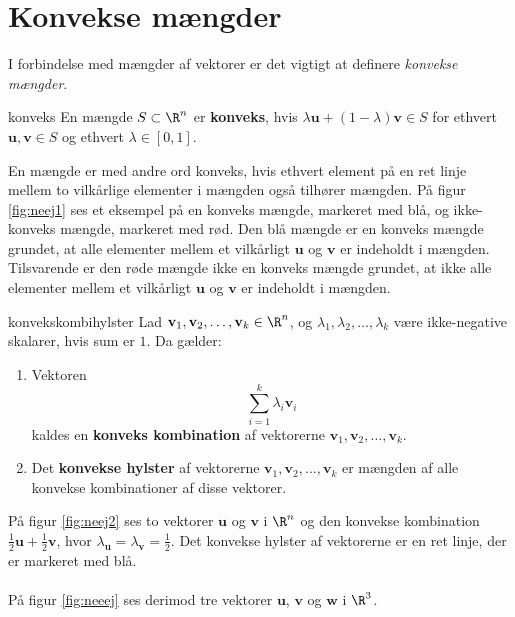 \section{Konvekse mængder}
\label{julieerlakker}
%
I forbindelse med mængder af vektorer er det vigtigt at definere \textit{konvekse mængder}.
%
\begin{defn}{}{konveks}
En mængde $S \subset \R^n$ er \textbf{konveks}, hvis $\lambda \textbf{u} + (1- \lambda ) \textbf{v} \in S$ for ethvert $\textbf{u}, \textbf{v} \in S$ og ethvert $\lambda \in [0,1]$. 
\end{defn}
\noindent
%
En mængde er med andre ord konveks, hvis ethvert element på en ret linje mellem to vilkårlige elementer i mængden også tilhører mængden. 
På figur \ref{fig:neej1} ses et eksempel på en konveks mængde, markeret med blå, og ikke-konveks mængde, markeret med rød.
Den blå mængde er en konveks mængde grundet, at alle elementer mellem et vilkårligt $\textbf{u}$ og $\textbf{v}$ er indeholdt i mængden.
Tilsvarende er den røde mængde ikke en konveks mængde grundet, at ikke alle elementer mellem et vilkårligt $\textbf{u}$ og $\textbf{v}$ er indeholdt i mængden.\\
%

%
\begin{defn}{}{konvekskombihylster}
Lad $\textbf{v}_1, \textbf{v}_2, \ldots, \textbf{v}_k \in \R^n$, og $\lambda_1, \lambda_2, \ldots, \lambda_k$ være ikke-negative skalarer, hvis sum er $1$. Da gælder:
%
\begin{enumerate}[label=(\alph*)]
	\item Vektoren $$\sum_{i=1}^{k} \lambda_i \textbf{v}_i$$ kaldes en \textbf{konveks kombination} af vektorerne $\textbf{v}_1, \textbf{v}_2, \ldots, \textbf{v}_k$. 
	\item Det \textbf{konvekse hylster} af vektorerne $\textbf{v}_1, \textbf{v}_2, \ldots, \textbf{v}_k$ er mængden af alle konvekse kombinationer af disse vektorer. 
\end{enumerate}
%
%
\end{defn}
%
På figur \ref{fig:neej2} ses to vektorer $\mathbf{u}$ og $\mathbf{v}$ i $\R^n$ og den konvekse kombination $\frac{1}{2} \mathbf{u}+\frac{1}{2} \mathbf{v}$, hvor $\lambda_\textbf{u} = \lambda_\textbf{v} = \frac{1}{2}$. 
Det konvekse hylster af vektorerne er en ret linje, der er markeret med blå. 
\\\\
%

%
På figur \ref{fig:neeej} ses derimod tre vektorer $\mathbf{u}$, $\mathbf{v}$ og $\mathbf{w}$ i $\R^3$. 
